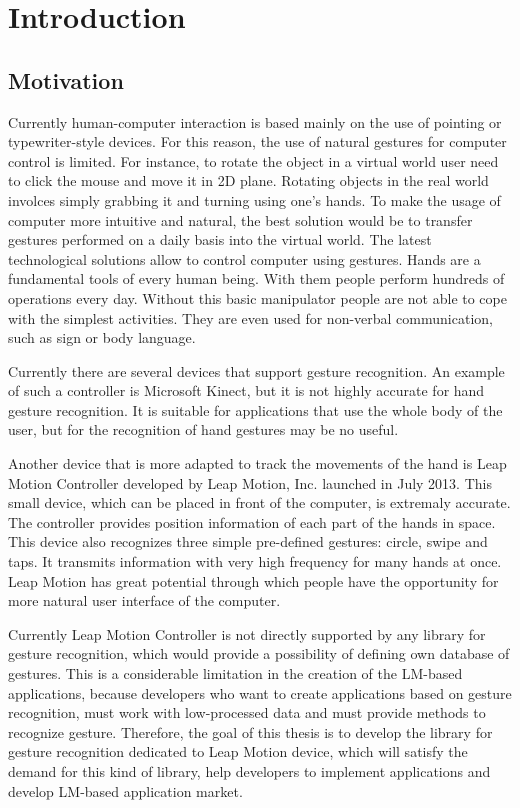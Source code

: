 
\chapter{Introduction}

\section{Motivation}

Currently human-computer interaction is based mainly on the use of pointing or typewriter-style devices. For this reason, the use of natural gestures for computer control is limited. For instance, to rotate the object in a virtual world user need to click the mouse and move it in 2D plane. Rotating objects in the real world involces simply grabbing it and turning using one's hands. To make the usage of computer more intuitive and natural, the best solution would be to transfer gestures performed on a daily basis into the virtual world. The latest technological solutions allow to control computer using gestures.
Hands are a fundamental tools of every human being. With them people perform hundreds of operations every day. Without this basic manipulator people are not able to cope with the simplest activities. They are even used for non-verbal communication, such as sign or body language.

Currently there are several devices that support gesture recognition. An example of such a controller is Microsoft Kinect, but it is not highly accurate for hand gesture recognition. It is suitable for applications that use the whole body of the user, but for the recognition of hand gestures may be no useful. 

Another device that is more adapted to track the movements of the hand is Leap Motion Controller developed by Leap Motion, Inc. launched in July 2013. This small device, which can be placed in front of the computer, is extremaly accurate. The controller provides position information of each part of the hands in space. This device also recognizes three simple pre-defined gestures: circle, swipe and taps. It transmits information with very high frequency for many hands at once. Leap Motion has great potential through which people have the opportunity for more natural user interface of the computer. 

Currently Leap Motion Controller is not directly supported by any library for gesture recognition, which would provide a possibility of defining own database of gestures. This is a considerable limitation in the creation of the LM-based applications, because developers who want to create applications based on gesture recognition, must work with low-processed data and must provide methods to recognize gesture.
Therefore, the goal of this thesis is to develop the library for gesture recognition dedicated to Leap Motion device, which will satisfy the demand for this kind of library, help developers to implement applications and develop LM-based application market.


